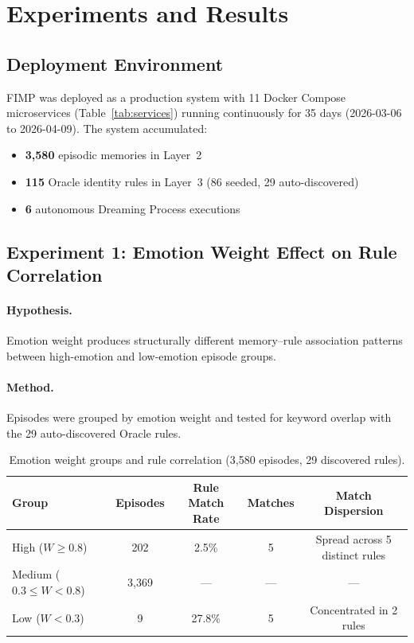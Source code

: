 \documentclass[11pt,a4paper]{article}
\begin{document}
\section{Experiments and Results}
\label{sec:experiments}

\subsection{Deployment Environment}

FIMP was deployed as a production system with 11 Docker Compose microservices
(Table~\ref{tab:services}) running continuously for 35 days (2026-03-06 to 2026-04-09).
The system accumulated:
\begin{itemize}[itemsep=2pt]
  \item \textbf{3,580} episodic memories in Layer~2
  \item \textbf{115} Oracle identity rules in Layer~3 (86 seeded, 29 auto-discovered)
  \item \textbf{6} autonomous Dreaming Process executions
\end{itemize}

\subsection{Experiment 1: Emotion Weight Effect on Rule Correlation}

\paragraph{Hypothesis.} Emotion weight produces structurally different memory--rule
association patterns between high-emotion and low-emotion episode groups.

\paragraph{Method.} Episodes were grouped by emotion weight and tested for keyword overlap
with the 29 auto-discovered Oracle rules.

\begin{table}[h]
\centering
\caption{Emotion weight groups and rule correlation (3,580 episodes, 29 discovered rules).}
\label{tab:exp1}
\small
\begin{tabular}{@{}lcccc@{}}
\toprule
\textbf{Group} & \textbf{Episodes} & \textbf{Rule Match Rate} & \textbf{Matches} & \textbf{Match Dispersion} \\
\midrule
High ($W \geq 0.8$)          & 202   & 2.5\%  & 5 & Spread across 5 distinct rules \\
Medium ($0.3 \leq W < 0.8$)  & 3,369 & ---    & --- & --- \\
Low ($W < 0.3$)              & 9     & 27.8\% & 5 & Concentrated in 2 rules \\
\bottomrule
\end{tabular}
\end{table}
\end{document}
